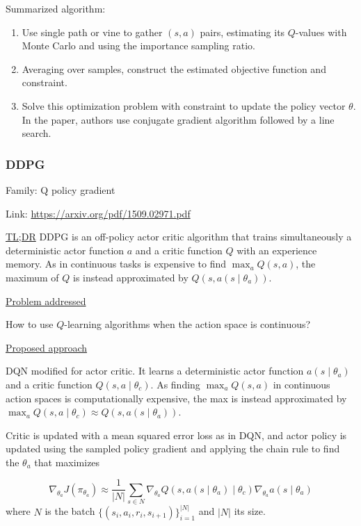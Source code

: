 \documentclass[12pt, english]{article}
\begin{document}
Summarized algorithm:

\begin{enumerate}
  \item Use single path or vine to gather $(s,a)$ pairs, estimating its $Q$-values with Monte Carlo and using the importance sampling ratio.
  \item Averaging over samples, construct the estimated objective function and constraint.
  \item Solve this optimization problem with constraint to update the policy vector $\theta$. In the paper, authors use conjugate gradient algorithm followed by a line search.
\end{enumerate}


\subsubsection{DDPG}
\label{DDPG}

Family: Q policy gradient

Link: \url{https://arxiv.org/pdf/1509.02971.pdf}

\underline{TL;DR}
DDPG \cite{lillicrap_continuous_2015} is an off-policy actor critic algorithm that trains simultaneously a deterministic actor function $a$ and a critic function $Q$ with an experience memory. As in continuous tasks is expensive to find $\max_a Q(s,a)$, the maximum of $Q$ is instead approximated by $Q(s, a(s \mid \theta_a))$.

\underline{Problem addressed}

How to use $Q$-learning algorithms when the action space is continuous?

\underline{Proposed approach}

DQN modified for actor critic. It learns a deterministic actor function $a(s \mid \theta_a)$ and a critic function $Q(s,a \mid \theta_c)$. As finding $\max_a Q(s,a)$ in continuous action spaces is computationally expensive, the max is instead approximated by $\max_a Q(s,a \mid \theta_c) \approx Q(s, a(s \mid \theta_a))$.

Critic is updated with a mean squared error loss as in DQN, and actor policy is updated using the sampled policy gradient and applying the chain rule to find the $\theta_a$ that maximizes

\begin{equation}
  \nabla_{\theta_a} J (\pi_{\theta_a}) \approx \frac{1}{|N|} \sum_{s \in N} \nabla_{\theta_a} Q(s,a(s \mid \theta_a) \mid \theta_c) \nabla_{\theta_a} a(s \mid \theta_a)
\end{equation}
%
where $N$ is the batch $\{(s_i, a_i, r_i, s_{i+1})\}^{|N|}_{i=1}$ and $|N|$ its size.
\end{document}
